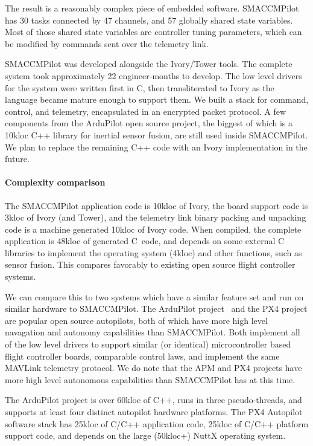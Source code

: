 The result is a reasonably complex piece of embedded software. SMACCMPilot has
30 tasks connected by 47 channels, and 57 globally shared state variables. Most
of those shared state variables are controller tuning parameters, which can be
modified by commands sent over the telemetry link.

SMACCMPilot was developed alongside the Ivory/Tower tools.  The complete system
took approximately 22 engineer-months to develop.  The low level drivers for the
system were written first in C, then transliterated to Ivory as the language
became mature enough to support them. We built a stack for command, control, and
telemetry, encapsulated in an encrypted packet protocol. A few components from
the ArduPilot open source project, the biggest of which is a 10kloc C++ library
for inertial sensor fusion, are still used inside SMACCMPilot. We plan to
replace the remaining C++ code with an Ivory implementation in the future.

\paragraph{Complexity comparison}
The SMACCMPilot application code is 10kloc of Ivory, the board support code is
3kloc of Ivory (and Tower), and the telemetry link binary packing and unpacking
code is a machine generated 10kloc of Ivory code. When compiled, the
complete application is 48kloc of generated C~code, and depends on some external
C libraries to implement the operating system (4kloc) and other functions, such
as sensor fusion.  This compares favorably to existing open source flight
controller systems.

We can compare this to two systems which have a similar feature set and run on
similar hardware to SMACCMPilot.  The ArduPilot project~\cite{apm-proj} and the
PX4 project are popular open source autopilots, both of which have more high
level navagation and autonomy capabilities than SMACCMPilot.  Both implement all
of the low level drivers to support similar (or identical) microcontroller based
flight controller boards, comparable control laws, and implement the same
MAVLink telemetry protocol. We do note that the APM and PX4 projects have more
high level autonomous capabilities than SMACCMPilot has at this time.

The ArduPilot project is over 60kloc of C++, runs in three pseudo-threads, and
supports at least four distinct autopilot hardware platforms. The PX4 Autopilot
software stack has 25kloc of C/C++ application code, 25kloc of C/C++ platform
support code, and depends on the large (50kloc+) NuttX operating system.

